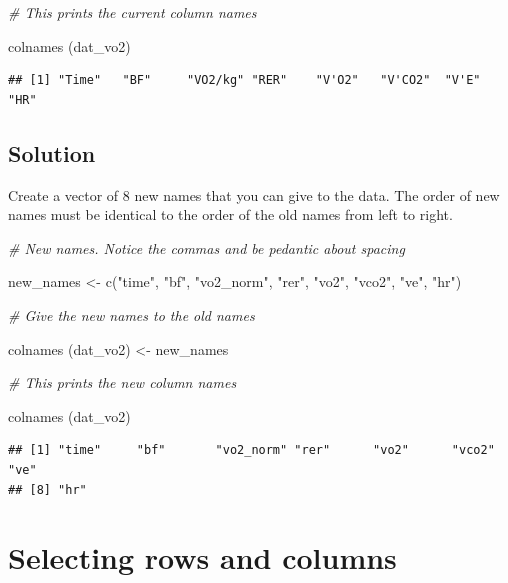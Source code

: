 \documentclass[
]{book}
\newenvironment{Shaded}{\begin{snugshade}}{\end{snugshade}}
\newcommand{\CommentTok}[1]{\textcolor[rgb]{0.56,0.35,0.01}{\textit{#1}}}
\newcommand{\FunctionTok}[1]{\textcolor[rgb]{0.00,0.00,0.00}{#1}}
\newcommand{\NormalTok}[1]{#1}
\newcommand{\OtherTok}[1]{\textcolor[rgb]{0.56,0.35,0.01}{#1}}
\newcommand{\StringTok}[1]{\textcolor[rgb]{0.31,0.60,0.02}{#1}}
\begin{document}
\begin{Shaded}
\begin{Highlighting}[]
\CommentTok{\# This prints the current column names}

\FunctionTok{colnames}\NormalTok{ (dat\_vo2) }
\end{Highlighting}
\end{Shaded}

\begin{verbatim}
## [1] "Time"   "BF"     "VO2/kg" "RER"    "V'O2"   "V'CO2"  "V'E"    "HR"
\end{verbatim}

\hypertarget{solution}{%
\subsection{Solution}\label{solution}}

Create a vector of 8 new names that you can give to the data. The order of new names must be identical to the order of the old names from left to right.

\begin{Shaded}
\begin{Highlighting}[]
\CommentTok{\# New names. Notice the commas and be pedantic about spacing}

\NormalTok{new\_names }\OtherTok{\textless{}{-}} \FunctionTok{c}\NormalTok{(}\StringTok{"time"}\NormalTok{, }\StringTok{"bf"}\NormalTok{, }\StringTok{"vo2\_norm"}\NormalTok{, }\StringTok{"rer"}\NormalTok{, }\StringTok{"vo2"}\NormalTok{, }\StringTok{"vco2"}\NormalTok{, }\StringTok{"ve"}\NormalTok{, }\StringTok{"hr"}\NormalTok{)}

\CommentTok{\# Give the new names to the old names}

\FunctionTok{colnames}\NormalTok{ (dat\_vo2)  }\OtherTok{\textless{}{-}}\NormalTok{ new\_names}

\CommentTok{\# This prints the new column names}

\FunctionTok{colnames}\NormalTok{ (dat\_vo2)  }
\end{Highlighting}
\end{Shaded}

\begin{verbatim}
## [1] "time"     "bf"       "vo2_norm" "rer"      "vo2"      "vco2"     "ve"      
## [8] "hr"
\end{verbatim}

\hypertarget{WRANGLE-SLICE}{%
\section{Selecting rows and columns}\label{WRANGLE-SLICE}}
\end{document}
